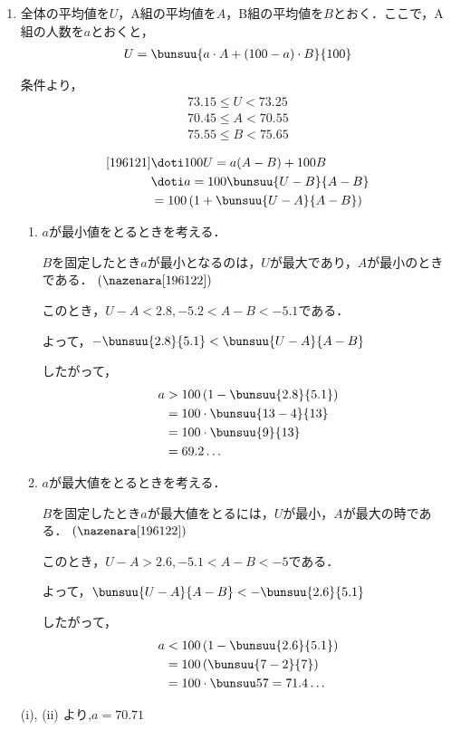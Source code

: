 \begin{enumerate}
    \item 全体の平均値を$U$，A組の平均値を$A$，B組の平均値を$B$とおく．ここで，A組の人数を$a$とおくと，
    \begin{align}
        U = \bunsuu{a \cdot A + (100-a) \cdot B}{100} \label{196121}
    \end{align}

    条件より，\begin{align*}
        73.15 \leq U < 73.25 \\
        70.45 \leq A < 70.55 \\
        75.55 \leq B < 75.65
    \end{align*}

    \begin{align}
        \eqref{196121} &\doti 100U = a(A-B) + 100B \\
        &\doti a = 100 \bunsuu{U-B}{A-B} \label{196122}\\
        & =100 \left(1 + \bunsuu{U-A}{A-B}  \label{196123}\right)
    \end{align}

    \begin{enumerate}
        \item $a$が最小値をとるときを考える．

        $B$を固定したとき$a$が最小となるのは，$U$が最大であり，$A$が最小のときである．
        $(\nazenara \eqref{196122})$

        このとき，$U - A < 2.8, -5.2 < A-B < -5.1$である．

        よって，$-\bunsuu{2.8}{5.1} < \bunsuu{U-A}{A-B}$

        したがって，\begin{align*}
            a &> 100\left(1-\bunsuu{2.8}{5.1}\right)\\
            &=100 \cdot \bunsuu{13-4}{13}\\
            &=100 \cdot \bunsuu{9}{13}\\
            &=69.2\ldots
        \end{align*}

        \item $a$が最大値をとるときを考える．

        $B$を固定したとき$a$が最大値をとるには，$U$が最小，$A$が最大の時である．
        $(\nazenara \eqref{196122})$

        このとき，$U - A > 2.6, -5.1 < A - B < -5$である．

        よって，$\bunsuu{U-A}{A-B} < -\bunsuu{2.6}{5.1}$

        したがって，\begin{align*}
            a &< 100\left(1-\bunsuu{2.6}{5.1}\right)\\
            &= 100\left(\bunsuu{7-2}{7}\right) \\
            &= 100 \cdot \bunsuu57 = 71.4\ldots
        \end{align*}
    \end{enumerate}

    (i), (ii) より,$a= 70.71$
\end{enumerate}
